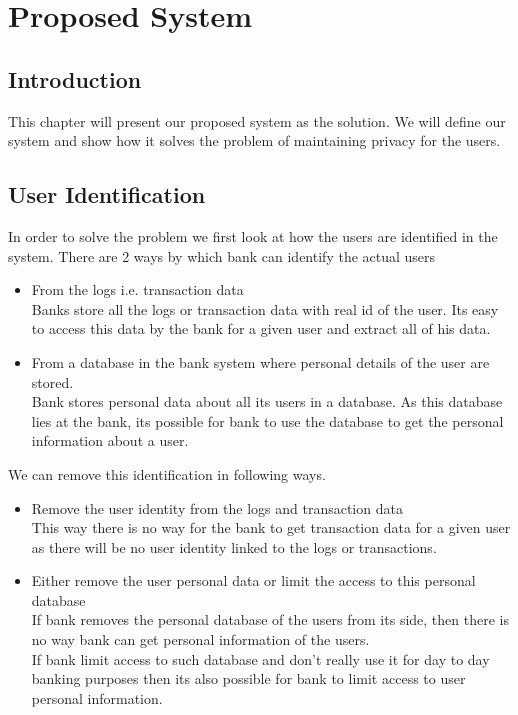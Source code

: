 \chapter{Proposed System}
\section{Introduction}
This chapter will present our proposed system as the solution. We will define our system and show how it solves the problem of maintaining privacy for the users.
\section{User Identification}
In order to solve the problem we first look at how the users are identified in the system. There are 2 ways by which bank can identify the actual users
\begin{itemize}
	\item From the logs i.e. transaction data
\\Banks store all the logs or transaction data with real id of the user. Its easy to access this data by the bank for a given user and extract all of his data.
	\item From a database in the bank system where personal details of the user are stored.	
\\Bank stores personal data about all its users in a database. As this database lies at the bank, its possible for bank to use the database to get the personal information about a user.
\end{itemize}
We can remove this identification in following ways.
\begin{itemize}
	\item Remove the user identity from the logs and transaction data
\\This way there is no way for the bank to get transaction data for a given user as there will be no user identity linked to the logs or transactions.
	\item Either remove the user personal data or limit the access to this personal database
\\If bank removes the personal database of the users from its side, then there is no way bank can get personal information of the users.
\\If bank limit access to such database and don't really use it for day to day banking purposes then its also possible for bank to limit access to user personal information.
\end{itemize}

